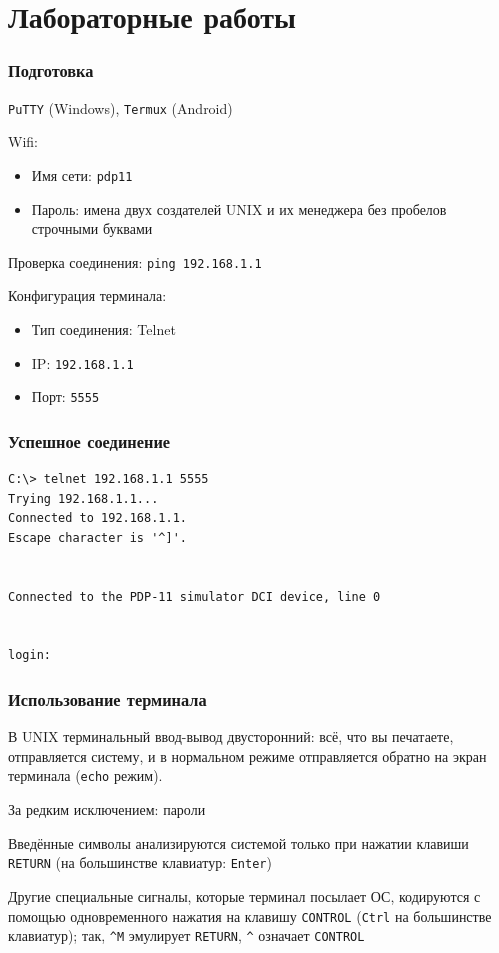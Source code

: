 \documentclass[t,aspectratio=169]{beamer}
\begin{document}
\section{Лабораторные работы}
\begin{frame}
    \frametitle{Подготовка}
    \texttt{PuTTY} (Windows), \texttt{Termux} (Android)
    \par\vspace{0.25cm}
    Wifi:
    \begin{itemize}
        \item Имя сети: \texttt{pdp11}
        \item Пароль: имена двух создателей UNIX и их менеджера без
            пробелов строчными буквами
    \end{itemize}
    \par\vspace{0.25cm}
    Проверка соединения: \texttt{ping 192.168.1.1}
    \par\vspace{0.25cm}
    Конфигурация терминала:
    \begin{itemize}
        \item Тип соединения: Telnet
        \item IP: \texttt{192.168.1.1}
        \item Порт: \texttt{5555}
    \end{itemize}
\end{frame}

\begin{frame}[fragile]
    \frametitle{Успешное соединение}
    \begin{verbatim}
C:\> telnet 192.168.1.1 5555
Trying 192.168.1.1...
Connected to 192.168.1.1.
Escape character is '^]'.


Connected to the PDP-11 simulator DCI device, line 0


login: 
	\end{verbatim}
\end{frame}

\begin{frame}
    \frametitle{Использование терминала}
    В UNIX терминальный ввод-вывод двусторонний: всё, что вы печатаете,
    отправляется систему, и в нормальном режиме отправляется обратно на
    экран терминала (\texttt{echo} режим).
    \par\vspace{0.25cm}
    За редким исключением: пароли
    \par\vspace{0.25cm}
    Введённые символы анализируются системой только при нажатии клавиши
    \texttt{RETURN} (на большинстве клавиатур: \texttt{Enter})
    \par\vspace{0.25cm}
    Другие специальные сигналы, которые терминал посылает ОС, кодируются
    с помощью одновременного нажатия на клавишу \texttt{CONTROL}
    (\texttt{Ctrl} на большинстве клавиатур); так, \texttt{\^}\texttt{M}
    эмулирует \texttt{RETURN}, \texttt{\^} означает \texttt{CONTROL}
\end{frame}
\end{document}
